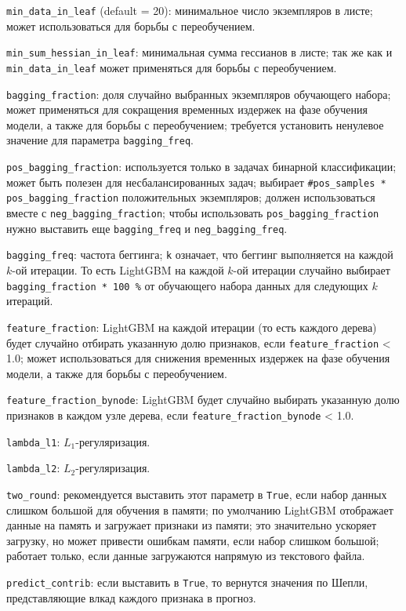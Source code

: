\documentclass[%
	11pt,
	a4paper,
	utf8,
		]{article}
\begin{document}
\verb|min_data_in_leaf| (default = 20): минимальное число экземпляров в листе; может использоваться для борьбы с переобучением.

\verb|min_sum_hessian_in_leaf|: минимальная сумма гессианов в листе; так же как и \verb|min_data_in_leaf| может применяться для борьбы с переобучением.

\verb|bagging_fraction|: доля случайно выбранных экземпляров обучающего набора; может применяться для сокращения временных издержек на фазе обучения модели, а также для борьбы с переобучением; требуется установить ненулевое значение для параметра \verb|bagging_freq|.

\verb|pos_bagging_fraction|: используется только в задачах бинарной классификации; может быть полезен для несбалансированных задач; выбирает \verb|#pos_samples * pos_bagging_fraction| положительных экземпляров; должен использоваться вместе с \verb|neg_bagging_fraction|; чтобы использовать \verb|pos_bagging_fraction| нужно выставить еще \verb|bagging_freq| и \verb|neg_bagging_freq|.

\verb|bagging_freq|: частота беггинга; \verb|k| означает, что беггинг выполняется на каждой $ k $-ой итерации. То есть LightGBM на каждой $ k $-ой итерации случайно выбирает \verb|bagging_fraction * 100 %| от обучающего набора данных для следующих $ k $ итераций.

\verb|feature_fraction|: LightGBM на каждой итерации (то есть каждого дерева) будет случайно отбирать указанную долю признаков, если \verb|feature_fraction| < 1.0; может использоваться для снижения временных издержек на фазе обучения модели, а также для борьбы с переобучением.

\verb|feature_fraction_bynode|: LightGBM будет случайно выбирать указанную долю признаков в каждом узле дерева, если \verb|feature_fraction_bynode| < 1.0.

\verb|lambda_l1|: $ L_1 $-регуляризация.

\verb|lambda_l2|: $ L_2 $-регуляризация.

\verb|two_round|: рекомендуется выставить этот параметр в \verb|True|, если набор данных слишком большой для обучения в памяти; по умолчанию LightGBM отображает данные на память и загружает признаки из памяти; это значительно ускоряет загрузку, но может привести ошибкам памяти, если набор слишком большой; работает только, если данные загружаются напрямую из текстового файла.

\verb|predict_contrib|: если выставить в \verb|True|, то вернутся значения по Шепли, представляющие влкад каждого признака в прогноз.
\end{document}
